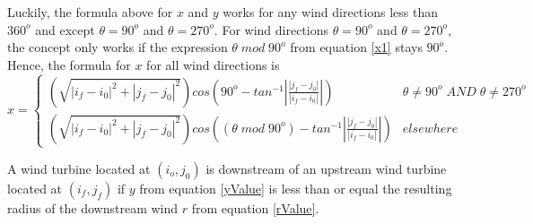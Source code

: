     Luckily, the formula above for $x$ and $y$ works for any wind directions less than $360^o$ and except $\theta=90^o$ and $\theta=270^o$. For wind directions $\theta=90^o$ and $\theta=270^o$, the concept only works if the expression $\theta \;mod\; 90^o$ from equation \ref{x1} stays $90^o$.
    Hence, the formula for $x$ for all wind directions is
    \begin{equation} \label{finalX}
        x =
        \begin{cases} 
            \left(\sqrt{\left| i_f-i_0 \right|^2+\left| j_f-j_0 \right|^2}\right)cos\left(90^o-tan^{-1}\left| \frac{\left| j_f-j_0 \right|}{\left| i_f-i_0 \right|} \right| \right) & \theta \neq 90^o \;AND\; \theta \neq 270^o \\
            \left(\sqrt{\left| i_f-i_0 \right|^2+\left| j_f-j_0 \right|^2}\right)cos\left( \left( \theta \;mod\; 90^o \right)-tan^{-1}\left| \frac{\left| j_f-j_0 \right|}{\left| i_f-i_0 \right|} \right| \right) & elsewhere
        \end{cases}
    \end{equation}
    
    A wind turbine located at $(i_o,j_0)$ is downstream of an upstream wind turbine located at $(i_f,j_f)$ if $y$ from equation \ref{yValue} is less than or equal the resulting radius of the downstream wind $r$ from equation \ref{rValue}.
    
    